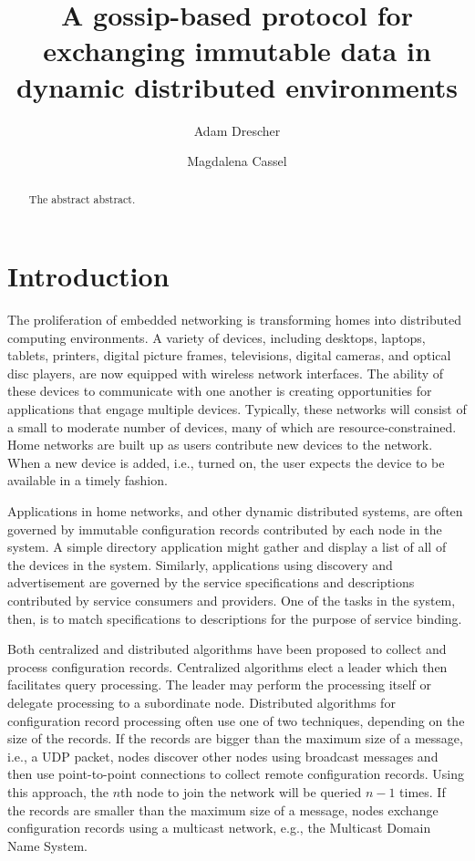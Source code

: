 \documentclass[letterpaper]{article}
\begin{document}
\title{A gossip-based protocol for exchanging immutable data in dynamic distributed environments}
\author{Adam Drescher \and Magdalena Cassel}
\date{}

\maketitle

\begin{abstract}
The abstract abstract.
\end{abstract}


\section{Introduction}
The proliferation of embedded networking is transforming homes into distributed computing environments.
A variety of devices, including desktops, laptops, tablets, printers, digital picture frames, televisions, digital cameras, and optical disc players, are now equipped with wireless network interfaces.
The ability of these devices to communicate with one another is creating opportunities for applications that engage multiple devices.
Typically, these networks will consist of a small to moderate number of devices, many of which are resource-constrained.
Home networks are built up as users contribute new devices to the network.
When a new device is added, i.e., turned on, the user expects the device to be available in a timely fashion.

Applications in home networks, and other dynamic distributed systems, are often governed by immutable configuration records contributed by each node in the system.
A simple directory application might gather and display a list of all of the devices in the system.
Similarly, applications using discovery and advertisement are governed by the service specifications and descriptions contributed by service consumers and providers.
One of the tasks in the system, then, is to match specifications to descriptions for the purpose of service binding.

Both centralized and distributed algorithms have been proposed to collect and process configuration records.
Centralized algorithms elect a leader which then facilitates query processing.
The leader may perform the processing itself or delegate processing to a subordinate node.
Distributed algorithms for configuration record processing often use one of two techniques, depending on the size of the records.
If the records are bigger than the maximum size of a message, i.e., a UDP packet, nodes discover other nodes using broadcast messages and then use point-to-point connections to collect remote configuration records.
Using this approach, the $n$th node to join the network will be queried $n-1$ times.
If the records are smaller than the maximum size of a message, nodes exchange configuration records using a multicast network, e.g., the Multicast Domain Name System.
\end{document}
